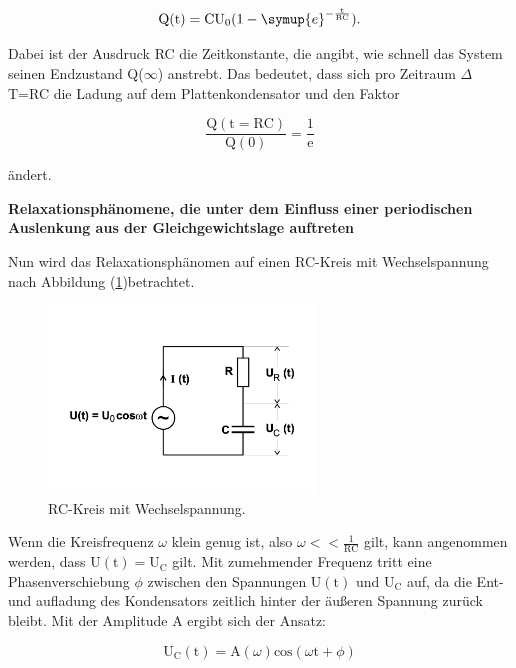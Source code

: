 \begin{enumerate}
\begin{equation}
\text{Q}(\text{t}) = \text{CU}_0 (1 - \symup{e}^{-\frac{\text{t}}{\text{RC}}}).
\end{equation}

Dabei ist der Ausdruck RC die Zeitkonstante, die angibt, wie schnell das System seinen Endzustand Q($\infty$) anstrebt.
Das bedeutet, dass sich pro Zeitraum $\Delta$T=RC die Ladung auf dem Plattenkondensator und den Faktor

\begin{equation}
\frac{\text{Q}(\text{t}=\text{RC})}{\text{Q}(0)} = \frac{1}{\text{e}}
\end{equation}

ändert.

\end{enumerate}

\newpage
\noindent
\textbf{Relaxationsphänomene, die unter dem Einfluss einer periodischen Auslenkung aus der Gleichgewichtslage auftreten}

\noindent
Nun wird das Relaxationsphänomen auf einen RC-Kreis mit Wechselspannung nach Abbildung (\ref{fig:rcwechsel})betrachtet.

\begin{figure}
            \centering
               \includegraphics[height=5cm]{rcwechsel.pdf}
               \caption{RC-Kreis mit Wechselspannung.}
               \label{fig:rcwechsel}
\end{figure}

\noindent
Wenn die Kreisfrequenz $\omega$ klein genug ist, also $\omega << \frac{1}{\text{RC}}$ gilt, kann angenommen werden, dass $\text{U}(\text{t}) = \text{U}_\text{C}$ gilt.
Mit zumehmender Frequenz tritt eine Phasenverschiebung $\phi$ zwischen den Spannungen $\text{U}(\text{t})$ und $\text{U}_\text{C}$ auf, da die Ent- und aufladung des Kondensators zeitlich hinter der äußeren Spannung zurück bleibt.
Mit der Amplitude A ergibt sich der Ansatz:

\begin{equation}
\text{U}_\text{C} (\text{t}) = \text{A} (\omega) \text{cos}(\omega\text{t} + \phi)
\end{equation}

